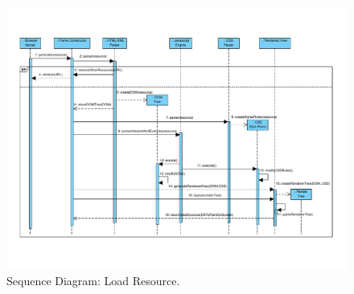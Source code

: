 \documentclass[prodmode,acmtecs]{acmsmall}
\begin{document}

    \begin{landscape}
      \begin{figure}[h!t]
      \vspace*{-2cm}
          \centering
          \hspace*{-1cm}\includegraphics[scale=0.8]{figures/LoadResource-v2.pdf}
          \vspace*{-2.2cm}
          \caption{Sequence Diagram: Load Resource.}
          \label{fig:LoadResource}
      \end{figure}
    \end{landscape}

    
\end{document}
